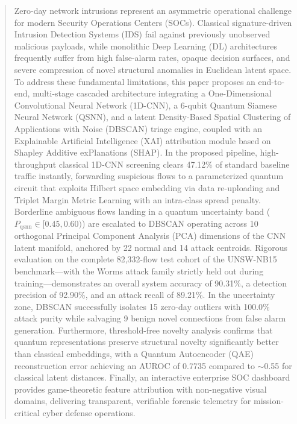 \documentclass[preprint,12pt]{elsarticle}
\begin{document}
\begin{frontmatter}
\begin{abstract}
Zero-day network intrusions represent an asymmetric operational challenge for modern Security Operations Centers (SOCs). Classical signature-driven Intrusion Detection Systems (IDS) fail against previously unobserved malicious payloads, while monolithic Deep Learning (DL) architectures frequently suffer from high false-alarm rates, opaque decision surfaces, and severe compression of novel structural anomalies in Euclidean latent space. To address these fundamental limitations, this paper proposes an end-to-end, multi-stage cascaded architecture integrating a One-Dimensional Convolutional Neural Network (1D-CNN), a 6-qubit Quantum Siamese Neural Network (QSNN), and a latent Density-Based Spatial Clustering of Applications with Noise (DBSCAN) triage engine, coupled with an Explainable Artificial Intelligence (XAI) attribution module based on Shapley Additive exPlanations (SHAP). In the proposed pipeline, high-throughput classical 1D-CNN screening clears 47.12\% of standard baseline traffic instantly, forwarding suspicious flows to a parameterized quantum circuit that exploits Hilbert space embedding via data re-uploading and Triplet Margin Metric Learning with an intra-class spread penalty. Borderline ambiguous flows landing in a quantum uncertainty band ($P_{\text{qsnn}} \in [0.45, 0.60)$) are escalated to DBSCAN operating across 10 orthogonal Principal Component Analysis (PCA) dimensions of the CNN latent manifold, anchored by 22 normal and 14 attack centroids. Rigorous evaluation on the complete 82,332-flow test cohort of the UNSW-NB15 benchmark—with the Worms attack family strictly held out during training—demonstrates an overall system accuracy of 90.31\%, a detection precision of 92.90\%, and an attack recall of 89.21\%. In the uncertainty zone, DBSCAN successfully isolates 15 zero-day outliers with 100.0\% attack purity while salvaging 9 benign novel connections from false alarm generation. Furthermore, threshold-free novelty analysis confirms that quantum representations preserve structural novelty significantly better than classical embeddings, with a Quantum Autoencoder (QAE) reconstruction error achieving an AUROC of 0.7735 compared to $\sim$0.55 for classical latent distances. Finally, an interactive enterprise SOC dashboard provides game-theoretic feature attribution with non-negative visual domains, delivering transparent, verifiable forensic telemetry for mission-critical cyber defense operations.
\end{abstract}


\end{frontmatter}
\end{document}
